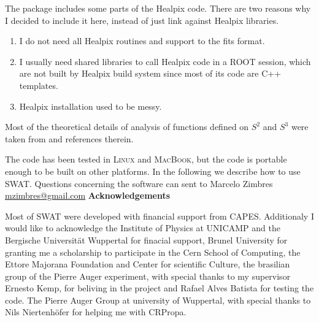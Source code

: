 \documentclass[12pt]{article}
\begin{document}
The package includes some parts of the Healpix code. There are two reasons why
I decided to include it here, instead of just link against Healpix libraries.
\begin{enumerate}
\item I do not need all Healpix routines and support to the fits format. 
\item I usually need shared libraries to call Healpix code in a ROOT session,
which are not built by Healpix build system since most of its code are C++
templates.
\item Healpix installation used to be messy.
\end{enumerate}

Most of the theoretical details of analysis of functions defined on $S^2$ and
$S^3$ were taken from \cite{wiaux} and references therein. 

The code has been tested in \textsc{Linux} and \textsc{MacBook}, but the code
is portable enough to be built on other platforms.  In the following we
describe how to use SWAT. Questions concerning the software can sent to Marcelo
Zimbres \href{mailto:mzimbres@gmail.com}{mzimbres@gmail.com}
\vspace{0.7cm}
\newline
{\bf \large Acknowledgements}
\vspace{0.7cm}

Most of SWAT were developed with financial support from CAPES.  Additionaly I
would like to acknowledge the Institute of Physics at UNICAMP and the Bergische
Universit\"at Wuppertal for finacial support, Brunel University for granting me a
scholarship to participate in the Cern School of Computing, the Ettore Majorana
Foundation and Center for scientific Culture, the brasilian group of the Pierre
Auger experiment, with special thanks to my supervisor Ernesto Kemp, for
beliving in the project and Rafael Alves Batista for testing the code. The
Pierre Auger Group at university of Wuppertal, with special thanks to Nils
Niertenh\"ofer for helping me with CRPropa.
\end{document}
